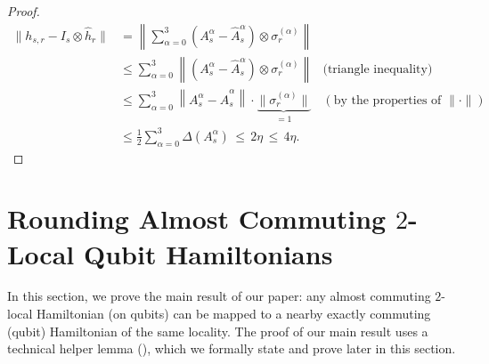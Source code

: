 \documentclass[a4paper,onecolumn,11pt]{quantumarticle}
\theoremstyle{plain}
\begin{document}
\begin{proof}
\begin{align*}
    \|h_{s,r} - I_s\otimes\hat{h}_{r}\| &= \left\|\sum\limits_{\alpha = 0}^{3} \left( A_s^{\alpha} - \hat{A}_s^{\alpha} \right)\otimes \sigma_{r}^{(\alpha)}\right\|\\
    &\leq \sum\limits_{\alpha = 0}^{3} \left\|\left( A_s^{\alpha} - \hat{A}_s^{\alpha} \right)\otimes \sigma_{r}^{(\alpha)} \right\| & \text{(triangle inequality)}\\
    &\leq \sum\limits_{\alpha = 0}^{3} \left\| A_s^{\alpha} - \hat{A}_s^{\alpha}  \right\| \cdot \underbrace{\| \sigma_r^{(\alpha)} \|}_{=1} & (\text{by the properties of } \|\cdot\|)\\
    &\leq \frac{1}{2}\sum\limits_{\alpha = 0}^{3} \Delta(A_{s}^{\alpha}) \,\leq\, 2\eta \,\leq\, 4 \eta.
\end{align*}
\end{proof}

\section{Rounding Almost Commuting $2$-Local Qubit Hamiltonians}
In this section, we prove the main result of our paper: any almost commuting $2$-local Hamiltonian (on qubits) can be mapped to a nearby exactly commuting (qubit) Hamiltonian of the same locality. The proof of our main result uses a technical helper lemma (), which we formally state and prove later in this section.
\end{document}
